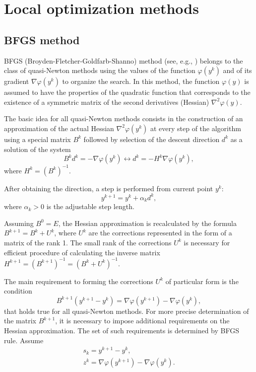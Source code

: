 \documentclass[runningheads]{llncs}
\begin{document}
\section{Local optimization methods}\label{sec:local}
\subsection{BFGS method}

BFGS (Broyden-Fletcher-Goldfarb-Shanno) method (see, e.g., \cite{Nocedal}) belongs to the class of quasi-Newton methods using the values of the function $\varphi(y^k)$ and of its gradient $\nabla \varphi(y^k)$ to organize the search. In this method, the function $\varphi(y)$ is assumed to have the properties of the quadratic function that corresponds to the existence of a symmetric matrix of the second derivatives (Hessian) $\nabla^2 \varphi(y)$.

The basic idea for all quasi-Newton methods consists in the construction of an approximation of the actual Hessian $\nabla^2 \varphi(y^k)$ at every step of the algorithm using a special matrix $B^k$ followed by selection of the descent direction $d^k$ as a solution of the system
$$ B^k d^k = -\nabla \varphi(y^k) \leftrightarrow d^k = -H^k \nabla \varphi(y^k),$$
where $H^k=\left(B^k\right)^{-1}$.

After obtaining the direction, a step is performed from current point $y^k$:
$$ y^{k+1}=y^k+ \alpha_k d^k,$$
where $\alpha_k>0$ is the adjustable step length.

Assuming $B^0=E$, the Hessian approximation is recalculated by the formula $B^{k+1}= B^k+ U^k$, where $U^k$ are the corrections represented in the form of a matrix of the rank 1. The small rank of the corrections $U^k$ is necessary for efficient procedure of calculating the inverse matrix $H^{k+1}=(B^{k+1})^{-1}=(B^k+ U^k)^{-1}$.

The main requirement to forming the corrections $U^k$ of particular form is the condition
$$B^{k+1} (y^{k+1} - y^k )= \nabla \varphi(y^{k+1})- \nabla \varphi(y^k),$$
that holds true for all quasi-Newton methods. For more precise determination of the matrix $B^{k+1}$, it is necessary to impose additional requirements on the Hessian approximation. The set of such requirements is determined by BFGS rule. Assume
\begin{gather}
s_k = y^{k+1} - y^k, \nonumber \\
z^k = \nabla \varphi(y^{k+1})- \nabla \varphi(y^k). \nonumber
\end{gather}
\end{document}
